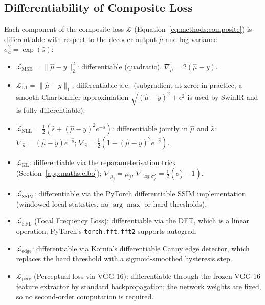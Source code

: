 \documentclass[12pt, a4paper, twoside, openright]{book}
\begin{document}
\begin{appendices}
\section{Differentiability of Composite Loss}
\label{app:maths:grad}

Each component of the composite loss $\mathcal{L}$ (Equation~\ref{eq:methods:composite}) is differentiable with respect to the decoder output $\hat{\mu}$ and log-variance $\hat{\sigma}_a^2 = \exp(\hat{s})$:

\begin{itemize}
  \item $\mathcal{L}_{\mathrm{MSE}} = \|\hat{\mu} - y\|_2^2$: differentiable (quadratic), $\nabla_{\hat{\mu}} = 2(\hat{\mu}-y)$.

  \item $\mathcal{L}_{\mathrm{L1}} = \|\hat{\mu} - y\|_1$: differentiable a.e.\ (subgradient at zero; in practice, a smooth Charbonnier approximation $\sqrt{(\hat{\mu}-y)^2 + \epsilon^2}$ is used by SwinIR and is fully differentiable).

  \item $\mathcal{L}_{\mathrm{NLL}} = \frac{1}{2}\!\left(\hat{s} + (\hat{\mu}-y)^2 e^{-\hat{s}}\right)$: differentiable jointly in $\hat{\mu}$ and $\hat{s}$:
    $\nabla_{\hat{\mu}} = (\hat{\mu}-y)e^{-\hat{s}}$;
    $\nabla_{\hat{s}} = \frac{1}{2}\left(1 - (\hat{\mu}-y)^2 e^{-\hat{s}}\right)$.

  \item $\mathcal{L}_{\mathrm{KL}}$: differentiable via the reparameterisation trick (Section~\ref{app:maths:elbo}); $\nabla_{\mu_j} = \mu_j$, $\nabla_{\log\sigma_j^2} = \frac{1}{2}(\sigma_j^2 - 1)$.

  \item $\mathcal{L}_{\mathrm{SSIM}}$: differentiable via the PyTorch differentiable SSIM implementation (windowed local statistics, no $\arg\max$ or hard thresholds).

  \item $\mathcal{L}_{\mathrm{FFL}}$ (Focal Frequency Loss): differentiable via the DFT, which is a linear operation; PyTorch's \texttt{torch.fft.fft2} supports autograd.

  \item $\mathcal{L}_{\mathrm{edge}}$: differentiable via Kornia's differentiable Canny edge detector, which replaces the hard threshold with a sigmoid-smoothed hysteresis step.

  \item $\mathcal{L}_{\mathrm{perc}}$ (Perceptual loss via VGG-16): differentiable through the frozen VGG-16 feature extractor by standard backpropagation; the network weights are fixed, so no second-order computation is required.
\end{itemize}


\end{appendices}
\end{document}
